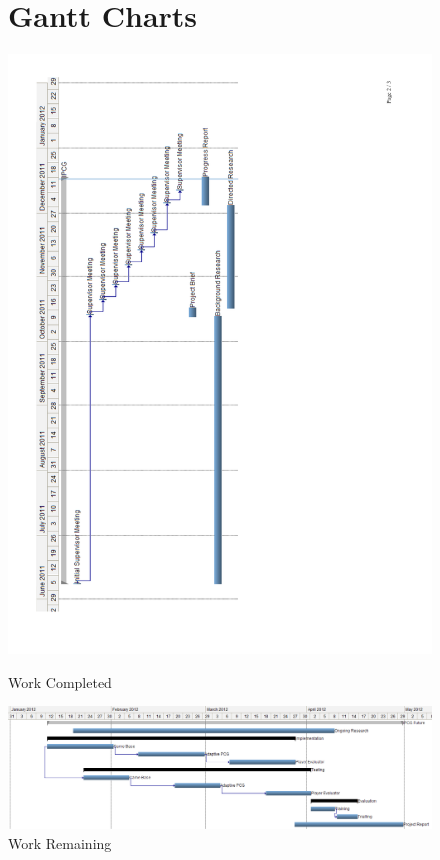 \documentclass[a4paper,oneside,12pt,openany]{memoir}
\begin{document}
\begin{figure}[ht]
\begin{minipage}[b]{0.5\linewidth}
\centering
\vspace{-5cm}
\chapter{Gantt Charts}


     \includegraphics[scale=0.7, trim = 12mm 30mm 95mm 30mm, clip]{done}
\caption{Work Completed}
\label{fig:figure1}
\end{minipage}
\hspace{0.5cm}
\begin{minipage}[b]{0.5\linewidth}
\centering
  \includegraphics[scale=0.5, angle=90, trim = 36mm 0mm 0mm 0mm, clip]{todo}
\caption{Work Remaining}
\label{fig:figure2}
\end{minipage}
\end{figure}
{}


\end{document}
